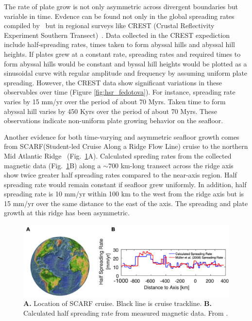 \documentclass[letterpaper,12pt,notitle]{memphisthesis}                     %
\begin{document}
The rate of plate grow is not only asymmetric across divergent boundaries but variable in time. Evdence can be found not only in the global spreading rates compiled by~\citet{Muller2008} but in regional surveys like CREST (Crustal Reflectivity Experiment Southern Transect)~\citep{Fedotova2017}. Data collected in the CREST expediction include half-spreading rates, times taken to form abyssal hills and abyssal hill heights. If plates grew at a constant rate, spreading rates and required times to form abyssal hills would be constant and byssal hill heights would be plotted as a sinusoidal curve with regular amplitude and frequency by assuming uniform plate spreading. However, the CREST data show significant variations in these observables over time (Figure \ref{fig:hsr_fedotova}). For instance, spreading rate varies by 15 mm/yr over the period of about 70 Myrs. Taken time to form abyssal hill varies by 450 Kyrs over the period of about 70 Myrs. These observations indicate non-uniform plate growing behavior on the seafloor.

Another evidence for both time-varying and asymmetric seafloor growth comes from SCARF(Student-led Cruise Along a Ridge Flow Line) cruise to the northern Mid Atlantic Ridge~\citep{Shinevar2018} (Fig.~\ref{fig:scarf}A). Calculated spreding rates from the collected magnetic data (Fig.~\ref{fig:scarf}B) along a $\sim$700 km-long transect across the ridge axis show twice greater half spreading rates compared to the near-axis region. Half spreading rate would remain constant if seafloor grew uniformly. In addition, half spreading rate is 10 mm/yr within 100 km to the west from the ridge axis but is 15 mm/yr over the same distance to the east of the axis. The spreading and plate growth at this ridge has been asymmetric. 
%
\begin{figure}[!htb]
	\centering
	\includegraphics[width=0.85\linewidth]{./figs/scarf.png}
	\caption{\textbf{A.} Location of SCARF cruise. Black line is cruise trackline. \textbf{B.} Calculated half spreading rate from measured magnetic data. From \citet{Shinevar2018}.}
	\label{fig:scarf}
\end{figure}
\end{document}
